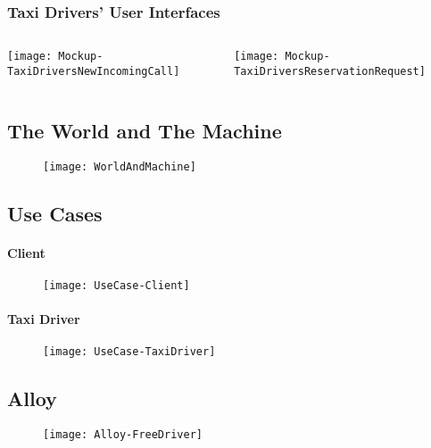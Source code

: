 \subsubsection{Taxi Drivers' User Interfaces}
\begin{frame}{\currentname{}}
\begin{columns}[c]
  \begin{column}{.5\textwidth}
		\texttt{[image: Mockup-TaxiDriversNewIncomingCall]}
		\centering
  \end{column}
  \begin{column}{.5\textwidth}
    \texttt{[image: Mockup-TaxiDriversReservationRequest]}
		\centering
  \end{column}
\end{columns}
\end{frame}

\subsection {The World and The Machine}

\begin{frame}{\currentname}

\begin{figure}[H]
\texttt{[image: WorldAndMachine]}
\centering
\end{figure}

\end{frame}

\subsection{Use Cases}

\begin{frame}{\currentname}

\framesubtitle{Client}

\begin{figure}[H]
\texttt{[image: UseCase-Client]}
\centering
\end{figure}

\end{frame}

\begin{frame}{\currentname}

\framesubtitle{Taxi Driver}

\begin{figure}[H]
\texttt{[image: UseCase-TaxiDriver]}
\centering
\end{figure}

\end{frame}

\subsection {Alloy}

\begin{frame}{\currentname}

\begin{figure}[H]
\texttt{[image: Alloy-FreeDriver]}
\centering
\end{figure}

\end{frame}